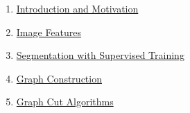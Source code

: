 \documentclass[11pt, a4paper, landscape]{article}
\begin{document}
\TitlePage

\NewPage{}
\vfill
\begin{enumerate}
\item \hyperlink{sli:introduction}{Introduction and Motivation}
\item \hyperlink{sli:features}{Image Features}
\item \hyperlink{sli:supervised}{Segmentation with Supervised Training}
\item \hyperlink{sli:construction}{Graph Construction}
\item \hyperlink{sli:algorithms}{Graph Cut Algorithms}

\end{enumerate}
\end{document}
